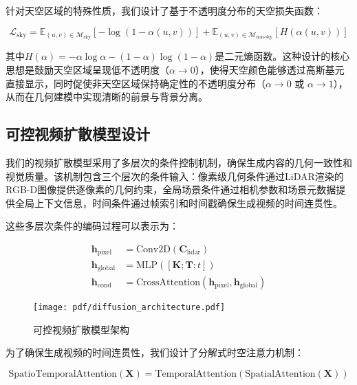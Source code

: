 针对天空区域的特殊性质，我们设计了基于不透明度分布的天空损失函数：

\begin{equation}
\mathcal{L}_{\text{sky}} = \mathbb{E}_{(u,v) \in \mathcal{M}_{\text{sky}}} [-\log(1-\alpha(u,v))] + \mathbb{E}_{(u,v) \in \mathcal{M}_{\text{non-sky}}} [H(\alpha(u,v))]
\label{eq:sky_loss_design}
\end{equation}

其中$H(\alpha) = -\alpha \log \alpha - (1-\alpha) \log(1-\alpha)$是二元熵函数。这种设计的核心思想是鼓励天空区域呈现低不透明度（$\alpha \rightarrow 0$），使得天空颜色能够透过高斯基元直接显示，同时促使非天空区域保持确定性的不透明度分布（$\alpha \rightarrow 0$ 或 $\alpha \rightarrow 1$），从而在几何建模中实现清晰的前景与背景分离。

\subsection{可控视频扩散模型设计}

我们的视频扩散模型采用了多层次的条件控制机制，确保生成内容的几何一致性和视觉质量。该机制包含三个层次的条件输入：像素级几何条件通过LiDAR渲染的RGB-D图像提供逐像素的几何约束，全局场景条件通过相机参数和场景元数据提供全局上下文信息，时间条件通过帧索引和时间戳确保生成视频的时间连贯性。

这些多层次条件的编码过程可以表示为：

\begin{align}
\mathbf{h}_{\text{pixel}} &= \text{Conv2D}(\mathbf{C}_{\text{lidar}}) \\
\mathbf{h}_{\text{global}} &= \text{MLP}([\mathbf{K}; \mathbf{T}; t]) \\
\mathbf{h}_{\text{cond}} &= \text{CrossAttention}(\mathbf{h}_{\text{pixel}}, \mathbf{h}_{\text{global}})
\label{eq:condition_encoding_multilevel}
\end{align}

\begin{figure}[htbp]
  \centering
  \texttt{[image: pdf/diffusion\_architecture.pdf]}
  \caption{可控视频扩散模型架构}
  \label{fig:diffusion-architecture}
\end{figure}

为了确保生成视频的时间连贯性，我们设计了分解式时空注意力机制：

\begin{equation}
\text{SpatioTemporalAttention}(\mathbf{X}) = \text{TemporalAttention}(\text{SpatialAttention}(\mathbf{X}))
\label{eq:factorized_attention}
\end{equation}

